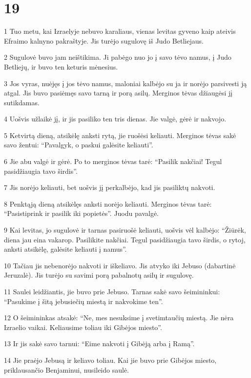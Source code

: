 \chapter{19}

\par 1 Tuo metu, kai Izraelyje nebuvo karaliaus, vienas levitas gyveno kaip ateivis Efraimo kalnyno pakraštyje. Jis turėjo sugulovę iš Judo Betliejaus. 
\par 2 Sugulovė buvo jam neištikima. Ji pabėgo nuo jo į savo tėvo namus, į Judo Betliejų, ir buvo ten keturis mėnesius. 
\par 3 Jos vyras, nuėjęs į jos tėvo namus, maloniai kalbėjo su ja ir norėjo parsivesti ją atgal. Jis buvo pasiėmęs savo tarną ir porą asilų. Merginos tėvas džiaugėsi jį sutikdamas. 
\par 4 Uošvis užlaikė jį, ir jis pasiliko ten tris dienas. Jie valgė, gėrė ir nakvojo. 
\par 5 Ketvirtą dieną, atsikėlę anksti rytą, jie ruošėsi keliauti. Merginos tėvas sakė savo žentui: “Pavalgyk, o paskui galėsite keliauti”. 
\par 6 Jie abu valgė ir gėrė. Po to merginos tėvas tarė: “Pasilik nakčiai! Tegul pasidžiaugia tavo širdis”. 
\par 7 Jis norėjo keliauti, bet uošvis jį perkalbėjo, kad jis pasiliktų nakvoti. 
\par 8 Penktąją dieną atsikėlęs anksti norėjo keliauti. Merginos tėvas tarė: “Pasistiprink ir pasilik iki popietės”. Juodu pavalgė. 
\par 9 Kai levitas, jo sugulovė ir tarnas pasiruošė keliauti, uošvis vėl kalbėjo: “Žiūrėk, diena jau eina vakarop. Pasilikite nakčiai. Tegul pasidžiaugia tavo širdis, o rytoj, anksti atsikėlę, galėsite keliauti į namus”. 
\par 10 Tačiau jis nebenorėjo nakvoti ir iškeliavo. Jis atvyko iki Jebuso (dabartinė Jeruzalė). Jis turėjo su savimi porą pabalnotų asilų ir sugulovę. 
\par 11 Saulei leidžiantis, jie buvo prie Jebuso. Tarnas sakė savo šeimininkui: “Pasukime į šitą jebusiečių miestą ir nakvokime ten”. 
\par 12 O šeimininkas atsakė: “Ne, mes nesuksime į svetimtaučių miestą. Jie nėra Izraelio vaikai. Keliausime toliau iki Gibėjos miesto”. 
\par 13 Ir jis sakė savo tarnui: “Eime nakvoti į Gibėją arba į Ramą”. 
\par 14 Jie praėjo Jebusą ir keliavo toliau. Kai jie buvo prie Gibėjos miesto, priklausančio Benjaminui, nusileido saulė. 
